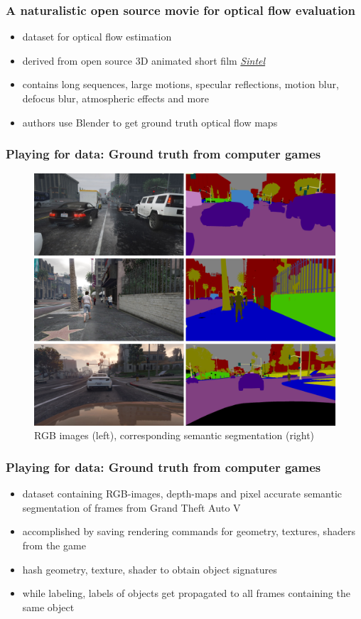 \documentclass{beamer}
\begin{document}
\begin{frame}
\frametitle{A naturalistic open source movie for optical flow evaluation}
\begin{itemize}
	\item dataset for optical flow estimation 
	\item derived from open source 3D animated short film \href{https://durian.blender.org/}{\textit{Sintel}}\\
	\item contains long sequences, large motions, specular reflections, motion blur, defocus blur, atmospheric effects and more
	\item authors use Blender to get ground truth optical flow maps
\end{itemize}
\end{frame}

\begin{frame}
\frametitle{Playing for data: Ground truth from computer games}
\cite{p4d}
\begin{figure}
	\includegraphics[width=0.5\linewidth]{../images/P4D.png}
	\caption{RGB images (left), corresponding semantic segmentation (right)}
\end{figure}
\end{frame}

\begin{frame}
\frametitle{Playing for data: Ground truth from computer games}

\begin{itemize}
	\item dataset containing RGB-images, depth-maps and pixel accurate semantic segmentation of frames from Grand Theft Auto V
	\item accomplished by saving rendering commands for geometry, textures, shaders from the game
	\item hash geometry, texture, shader to obtain object signatures
	\item while labeling, labels of objects get propagated to all frames containing the same object
\end{itemize}

\end{frame}
\end{document}
